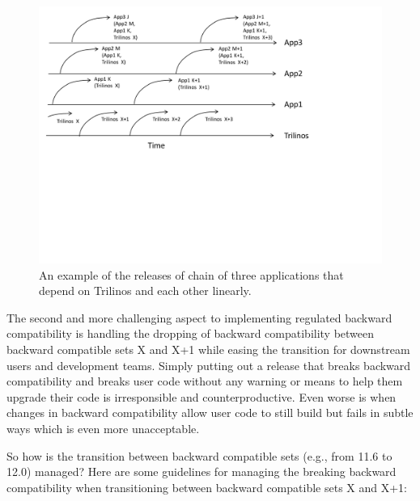 \documentclass[11pt]{SANDreport}
\begin{document}
\begin{figure}[p]
\begin{center}
\includegraphics[trim = 0.2in 3.2in 2.2in 0.1in, scale=0.75]
{ThreeAppsDependingOnTrilinosReleases}
{}\caption{An example of the releases of chain of three applications
that depend on Trilinos and each other linearly.}
\label{fig:ThreeAppsDependingOnTrilinosReleases}
\end{center}
\end{figure}

The second and more challenging aspect to implementing regulated
backward compatibility is handling the dropping of backward
compatibility between backward compatible sets X and X+1 while easing
the transition for downstream users and development teams.  Simply
putting out a release that breaks backward compatibility and breaks
user code without any warning or means to help them upgrade their code
is irresponsible and counterproductive.  Even worse is when changes in
backward compatibility allow user code to still build but fails in
subtle ways which is even more unacceptable.

So how is the transition between backward compatible sets (e.g., from
11.6 to 12.0) managed?  Here are some guidelines for managing the
breaking backward compatibility when transitioning between backward
compatible sets X and X+1:
\end{document}
